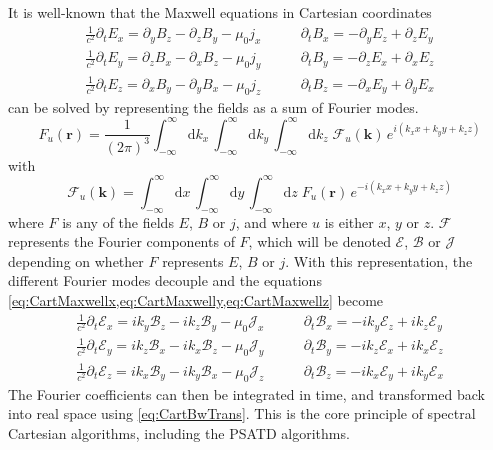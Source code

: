 \documentclass[1p,times,authoryear]{elsarticle}
\newcommand{\Integ}[1]{\int_{-\infty}^{\infty} \!\!\!\!\!\!
  \mathrm{d}#1}
\renewcommand{\vec}[1]{\boldsymbol{#1}}
\begin{document}
It is well-known that the Maxwell equations in Cartesian coordinates 
\begin{align}
\frac{1}{c^2}\partial_t E_x = \partial_y B_z - \partial_z B_y - \mu_0  j_x \qquad&   
\partial_t B_x = -\partial_y E_z + \partial_z E_y \label{eq:CartMaxwellx} \\
\frac{1}{c^2}\partial_t E_y = \partial_z B_x - \partial_x B_z - \mu_0  j_y \qquad &   
\partial_t B_y = -\partial_z E_x + \partial_x E_z \label{eq:CartMaxwelly}  \\
\frac{1}{c^2}\partial_t E_z = \partial_x B_y - \partial_y B_x - \mu_0  j_z \qquad &   
\partial_t B_z = -\partial_x E_y + \partial_y E_x \label{eq:CartMaxwellz} 
\end{align}
can be solved by representing the fields as a sum of Fourier modes.
\begin{equation}
\label{eq:CartBwTrans}
F_u(\vec{r}) = \frac{1}{(2\pi)^{3}}\Integ{k_x} \,\Integ{k_y}\,
\Integ{k_z} \; \mathcal{F}_u(\vec{k}) \, e^{i(k_x x + k_y y + k_z z)} 
\end{equation}
with 
\begin{equation}
\label{eq:CartFwTrans}
\mathcal{F}_u(\vec{k})  = \Integ{x} \,\Integ{y}\, \Integ{z} \;
F_u(\vec{r}) \, e^{-i(k_x x + k_y y + k_z z)} 
\end{equation}
where $F$ is any of the fields $E$, $B$ or $j$, and where $u$ is
either $x$, $y$ or $z$. $\mathcal{F}$ represents the Fourier
components of $F$, which will be denoted
$\mathcal{E}$, $\mathcal{B}$ or $\mathcal{J}$ depending on whether
$F$ represents $E$, $B$ or $j$. With this representation, the
different Fourier modes decouple and the equations 
\cref{eq:CartMaxwellx,eq:CartMaxwelly,eq:CartMaxwellz} become 
\begin{align}
\frac{1}{c^2}\partial_t \mathcal{E}_x = ik_y \mathcal{B}_z - ik_z \mathcal{B}_y - \mu_0 \mathcal{J}_x \qquad &   
\partial_t \mathcal{B}_x = -ik_y \mathcal{E}_z + ik_z \mathcal{E}_y \label{eq:CartSpectMaxwellx}\\
\frac{1}{c^2}\partial_t \mathcal{E}_y = ik_z \mathcal{B}_x - ik_x \mathcal{B}_z - \mu_0  \mathcal{J}_y \qquad &   
\partial_t \mathcal{B}_y = -ik_z \mathcal{E}_x + ik_x \mathcal{E}_z \label{eq:CartSpectMaxwelly}\\
\frac{1}{c^2}\partial_t \mathcal{E}_z = ik_x \mathcal{B}_y - ik_y \mathcal{B}_x - \mu_0 \mathcal{J}_z  \qquad &   
\partial_t \mathcal{B}_z = -ik_x \mathcal{E}_y + ik_y \mathcal{E}_x \label{eq:CartSpectMaxwellz}
\end{align}
The Fourier coefficients can then be integrated in time, and
transformed back into real space using \cref{eq:CartBwTrans}. This is
the core principle of spectral Cartesian algorithms, including the PSATD algorithms.
\end{document}
